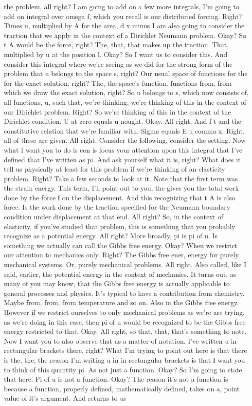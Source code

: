 \documentclass[10pt]{article}
\begin{document}
{the problem, all right? I am going to add on a few more integrals, I'm going to add on integral over omega f, which you recall is our distributed forcing. Right? Times u, multiplied by A for the area, d x minus I am also going to consider the traction that we apply in the context of a Dirichlet Neumann problem. Okay? So t A would be the force, right? The, that, that makes up the traction. That, multiplied by u at the position l. Okay? So I want us to consider this. And consider this integral where we're seeing as we did for the strong form of the problem that u belongs to the space s, right? Our usual space of functions for the for the exact solution, right? The, the space's function, functions from, from which we draw the exact solution, right? So u belongs to s, which now consists of, all functions, u, such that, we're thinking, we're thinking of this in the context of our Dirichlet problem. Right? So we're thinking of this in the context of the Dirichlet condition. U at zero equals u nought. Okay. All right. And f t and the constitutive relation that we're familiar with. Sigma equals E u comma x. Right, all of these are given. All right. Consider the following, consider the setting. Now what I want you to do is con is focus your attention upon this integral that I've defined that I've written as pi. And ask yourself what it is, right? What does it tell us physically at least for this problem if we're thinking of an elasticity problem. Right? Take a few seconds to look at it. Note that the first term was the strain energy. This term, I'll point out to you, the gives you the total work done by the force f on the displacement. And this recognizing that t A is also force. Is the work done by the traction specified for the Neumann boundary condition under displacement at that end. All right? So, in the context of elasticity, if you've studied that problem, this is something that you probably recognize as a potential energy. All right? More broadly, pi is pi of u. Is something we actually can call the Gibbs free energy. Okay? When we restrict our attention to mechanics only. Right? The Gibbs free ener, energy for purely mechanical systems. Or, purely mechanical problems. All right. Also called, like I said, earlier, the potential energy in the context of mechanics. It turns out, as many of you may know, that the Gibbs free energy is actually applicable to general processes and physics. It's typical to have a contribution from chemistry. Maybe from, from, from temperature and so on. Also in the Gibbs free energy. However if we restrict ourselves to only mechanical problems as we're are trying, as we're doing in this case, then pi of u would be recognized to be the Gibbs free energy restricted to that. Okay. All right, so that, that, that's something to note. Now I want you to also observe that as a matter of notation. I've written u in rectangular brackets there, right? What I'm trying to point out here is that there is the, the, the reason I'm writing u in in rectangular brackets is that I want you to think of this quantity pi. As not just a function. Okay? So I'm going to state that here. Pi of u is not a function. Okay? The reason it's not a function is because a function, properly defined, mathematically defined, takes on a, point value of it's argument. And returns to us }
\end{document}
